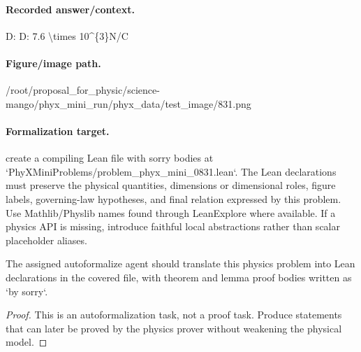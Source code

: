 \paragraph{Recorded answer/context.}
D: D: 7.6 \textbackslash{}times 10\textasciicircum{}\{3\}N/C

\paragraph{Figure/image path.}
/root/proposal\_for\_physic/science-mango/phyx\_mini\_run/phyx\_data/test\_image/831.png

\paragraph{Formalization target.}
create a compiling Lean file with sorry bodies at `PhyXMiniProblems/problem\_phyx\_mini\_0831.lean`. The Lean declarations must preserve the physical quantities, dimensions or dimensional roles, figure labels, governing-law hypotheses, and final relation expressed by this problem.
Use Mathlib/Physlib names found through LeanExplore where available. If a physics API is missing, introduce faithful local abstractions rather than scalar placeholder aliases.

\begin{theorem}
\label{thm:physics:phyx_mini_0831:target}
The assigned autoformalize agent should translate this physics problem into Lean declarations in the covered file, with theorem and lemma proof bodies written as `by sorry`.
\end{theorem}
\begin{proof}
This is an autoformalization task, not a proof task. Produce statements that can later be proved by the physics prover without weakening the physical model.
\end{proof}

